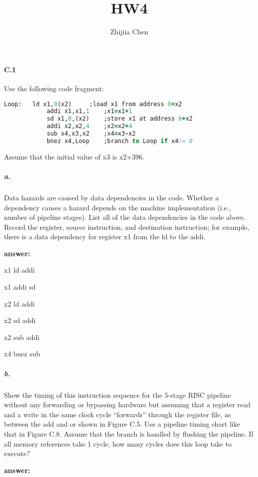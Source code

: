 \documentclass{article}
\title{HW4}
\author{Zhijiia Chen}
\begin{document}
\maketitle

\paragraph{C.1} Use the following code fragment:
\begin{lstlisting}[language=Fortran]
    Loop:   ld x1,0(x2)     ;load x1 from address 0+x2 
            addi x1,x1,1    ;x1=x1+1
            sd x1,0,(x2)    ;store x1 at address 0+x2
            addi x2,x2,4    ;x2=x2+4
            sub x4,x3,x2    ;x4=x3-x2
            bnez x4,Loop    ;branch to Loop if x4!= 0
\end{lstlisting}

Assume that the initial value of x3 is x2+396.

\subparagraph{a.} Data hazards are caused by data dependencies in the code. Whether a dependency causes a hazard depends on the machine implementation (i.e., number of pipeline stages). List all of the data dependencies in the code above. Record the register, source instruction, and destination instruction; for example, there is a data dependency for register x1 from the ld to the addi.

\noindent \textbf{answer:}

x1 ld addi

x1 addi sd

x2 ld addi

x2 sd addi

x2 sub addi

x4 bnez sub

\subparagraph{b.} Show the timing of this instruction sequence for the 5-stage RISC pipeline without any forwarding or bypassing hardware but assuming that a register read and a write in the same clock cycle “forwards” through the register file, as between the add and or shown in Figure C.5. Use a pipeline timing chart like that in Figure C.8. Assume that the branch is handled by flushing the pipeline. If all memory references take 1 cycle, how many cycles does this loop take to execute?

\noindent \textbf{answer:} 
\end{document}
